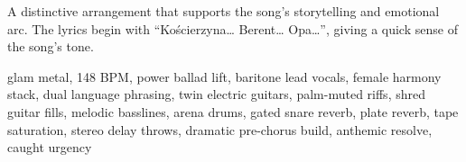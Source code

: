 

\begin{notes}
A distinctive arrangement that supports the song's storytelling and emotional arc. %
The lyrics begin with “Kościerzyna… Berent… Opa…”, giving a quick sense of the song’s tone.
\end{notes}

\begin{style}
glam metal, 148 BPM, power ballad lift, baritone lead vocals, female harmony stack, dual language phrasing, twin electric guitars, palm-muted riffs, shred guitar fills, melodic basslines, arena drums, gated snare reverb, plate reverb, tape saturation, stereo delay throws, dramatic pre-chorus build, anthemic resolve, caught urgency
\end{style}

